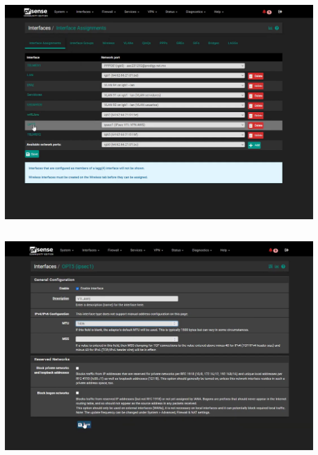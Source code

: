 \documentclass{article} %
\begin{document}
\noindent 

\noindent 

\noindent \includegraphics*[width=6.01in, height=3.71in, trim=0.32in 0.70in 0.49in 0.34in]{image41}

\noindent 

\noindent 

\noindent \includegraphics*[width=6.12in, height=3.85in, trim=0.48in 0.46in 0.48in 0.41in]{image42}

\noindent 

\noindent 
\end{document}
